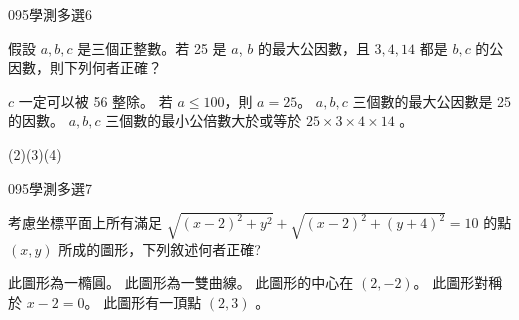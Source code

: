 \begin{QUESTIONS}
    \begin{QUESTION}
        \begin{ExamInfo}{095}{學測}{多選}{6}
        \end{ExamInfo}
        \begin{ExamAnsRateInfo}{15}{27}{8}{10}
        \end{ExamAnsRateInfo}
        \begin{QBODY}
			假設 $a, b, c$ 是三個正整數。若 25 是 $a$, $b$ 的最大公因數，且 $3,4,14$ 都是 $b,c$ 的公因數，則下列何者正確？
				\begin{QOPS} 
					\QOP $c$ 一定可以被 56 整除。 
					\QOP 若 $a \leq 100$，則 $a=25$。 
					\QOP $a, b, c$ 三個數的最大公因數是 25	的因數。
					\QOP $a,b,c$ 三個數的最小公倍數大於或等於 $25 \times 3 \times 4 \times 14$ 。
				\end{QOPS}
        \end{QBODY}
        \begin{QFROMS}
        \end{QFROMS}
        \begin{QTAGS}\end{QTAGS}
        \begin{QANS}
            (2)(3)(4)
        \end{QANS}
        \begin{QSOLLIST}
        \end{QSOLLIST}
        \begin{QEMPTYSPACE}
        \end{QEMPTYSPACE}
    \end{QUESTION}
    \begin{QUESTION}
        \begin{ExamInfo}{095}{學測}{多選}{7}
        \end{ExamInfo}
        \begin{ExamAnsRateInfo}{47}{83}{44}{14}
        \end{ExamAnsRateInfo}
        \begin{QBODY}
			考慮坐標平面上所有滿足 $\sqrt{(x-2)^2 +y^2} + \sqrt{(x-2)^2 +(y+4)^2} =10$ 的點 $(x,y)$ 所成的圖形，下列敘述何者正確? 
			\begin{QOPS} 
				\QOP 此圖形為一橢圓。
				\QOP 此圖形為一雙曲線。 
				\QOP 此圖形的中心在 $(2,-2)$。
				\QOP 此圖形對稱於 $x-2=0$。    
				\QOP 此圖形有一頂點 $(2, 3)$ 。
			\end{QOPS}
        \end{QBODY}
        \begin{QFROMS}

\end{QFROMS}
\end{QUESTION}
\end{QUESTIONS}
